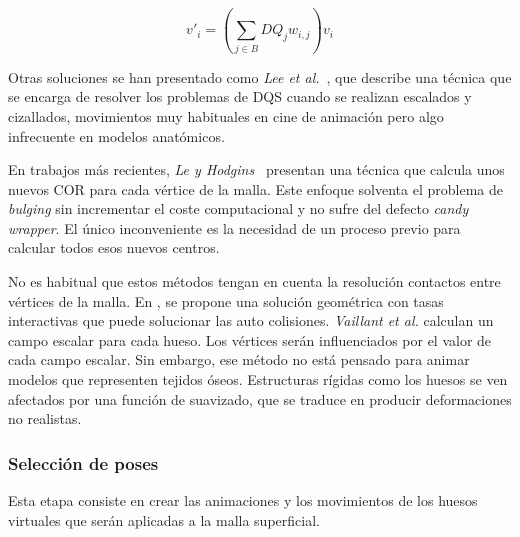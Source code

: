 \begin{equation}
\label{eqn:DQS}
v'_{i} = (\sum_{j \in B} DQ_{j}w_{i,j}) v_{i}
\end{equation}

Otras soluciones se han presentado como \emph{Lee et al.}~\cite{Lee2013}, que describe una técnica que se encarga de resolver los problemas de \ac{DQS} cuando se realizan escalados y cizallados, movimientos muy habituales en cine de animación pero algo infrecuente en modelos anatómicos.

En trabajos más recientes, \emph{Le y Hodgins}~\cite{le2016real} presentan una técnica que calcula unos nuevos \ac{COR} para cada vértice de la malla. Este enfoque solventa el problema de \emph{bulging} sin incrementar el coste computacional y no sufre del defecto \emph{candy wrapper}. El único inconveniente es la necesidad de un proceso previo para calcular todos esos nuevos centros.


%
%
No es habitual que estos métodos tengan en cuenta la resolución contactos entre vértices de la malla. En \cite{Vaillant:2014}, se propone una solución geométrica con tasas interactivas que puede solucionar las auto colisiones. \emph{Vaillant et al.} calculan un campo escalar para cada hueso. Los vértices serán influenciados por el valor de cada campo escalar. Sin embargo, ese método no está pensado para animar modelos que representen tejidos óseos. Estructuras rígidas como los huesos se ven afectados por una función de suavizado, que se traduce en producir deformaciones no realistas. %



\subsubsection{Selección de poses} 
\label{art:poses}
Esta etapa consiste en crear las animaciones  y los movimientos de los huesos virtuales que serán aplicadas a la malla superficial.   

